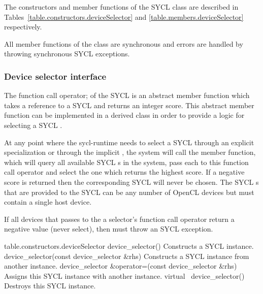 The constructors and member functions of the SYCL  class are described in Tables~\ref{table.constructors.deviceSelector} and \ref{table.members.deviceSelector} respectively.

All member functions of the  class are synchronous and errors are handled by throwing synchronous SYCL exceptions.

\subsubsection{Device selector interface}

The function call operator;  of the SYCL  is an abstract member function which takes a reference to a SYCL  and returns an integer score.  This abstract member function can be implemented in a derived class in order to provide a logic for selecting a SYCL .

At any point where the \gls{sycl-runtime} needs to select a SYCL  through an explicit  specialization or through the implicit , the system will call the  member function, which will query all available SYCL s in the system, pass each to this function call operator and select the one which returns the highest score. If a negative score is returned then the corresponding SYCL  will never be chosen. The SYCL s that are provided to the SYCL  can be any number of OpenCL devices but must contain a single host device.

If all devices that  passes to the a selector's function call operator return a negative value (never select), then  must throw an  SYCL exception.


{table.constructors.deviceSelector}
\addRow
{device_selector()}
{
  Constructs a SYCL instance.
}
\addRow
{device_selector(const device_selector \&rhs)}
{
  Constructs a SYCL  instance from another instance.
}
\addRow
{device_selector \&operator=(const device_selector \&rhs)}
{
  Assigns this SYCL  instance with another instance.
}
\addRow
{virtual ~device_selector()}
{
  Destroys this SYCL  instance.
}
\completeTable

